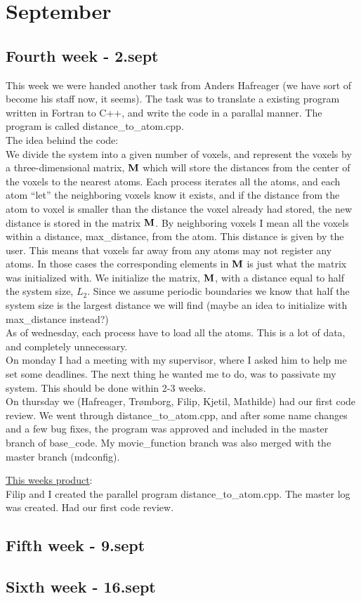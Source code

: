 \chapter{September}

\section{Fourth week - 2.sept}
This week we were handed another task from Anders Hafreager (we have sort of become his staff now, it seems). The task was to translate a existing program written in Fortran to C++, and write the code in a parallal manner. The program is called distance\_to\_atom.cpp. \\
The idea behind the code:\\
We divide the system into a given number of voxels, and represent the voxels by a three-dimensional matrix, $\mathbf{M}$ which will store the distances from the center of the voxels to the nearest atoms. Each process iterates all the atoms, and each atom ``let'' the neighboring voxels know it exists, and if the distance from the atom to voxel is smaller than the distance the voxel already had stored, the new distance is stored in the matrix $\mathbf{M}$. By neighboring voxels I mean all the voxels within a distance, max\_distance, from the atom. This distance is given by the user. This means that voxels far away from any atoms may not register any atoms. In those cases the corresponding elements in $\mathbf{M}$ is just what the matrix was initialized with.
We initialize the matrix, $\mathbf{M}$, with a distance equal to half the system size, $L_2$. Since we assume periodic boundaries we know that half the system size is the largest distance we will find (maybe an idea to initialize with max\_distance instead?)\\
As of wednesday, each process have to load all the atoms. This is a lot of data, and completely unnecessary.\\

On monday I had a meeting with my supervisor, where I asked him to help me set some deadlines. The next thing he wanted me to do, was to passivate my system. This should be done within 2-3 weeks.\\
On thursday we (Hafreager, Trømborg, Filip, Kjetil, Mathilde) had our first code review. We went through distance\_to\_atom.cpp, and after some name changes and a few bug fixes, the program was approved and included in the master branch of base\_code. My movie\_function branch was also merged with the master branch (mdconfig).
\begin{framed}
\underline{This weeks product}:\\
Filip and I created the parallel program distance\_to\_atom.cpp. The master log was created. Had our first code review.
\end{framed}
\section{Fifth week - 9.sept}
\section{Sixth week - 16.sept}